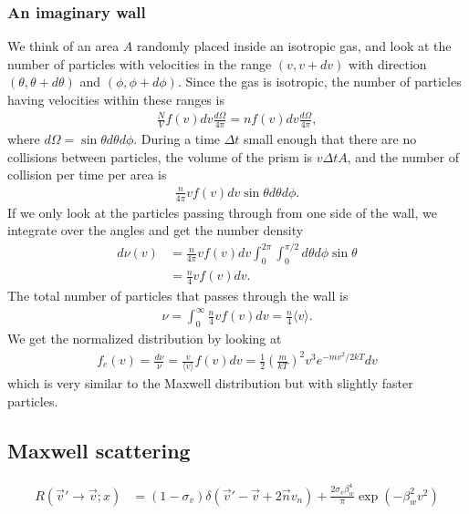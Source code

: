 \subsubsection{An imaginary wall}
We think of an area $A$ randomly placed inside an isotropic gas, and look at the number of particles with velocities in the range $(v, v+dv)$ with direction $(\theta, \theta + d\theta)$ and $(\phi, \phi + d\phi)$. Since the gas is isotropic, the number of particles having velocities within these ranges is 
\begin{align*}
	\frac{N}{V}f(v)dv \frac{d\Omega}{4\pi} = nf(v)dv \frac{d\Omega}{4\pi},
\end{align*}
where $d\Omega=\sin\theta d\theta d\phi$. During a time $\Delta t$ small enough that there are no collisions between particles, the volume of the prism is $v\Delta t A$, and the number of collision per time per area is 
\begin{align*}
	\frac{n}{4\pi} v f(v)dv \sin\theta d\theta d\phi.
\end{align*}
If we only look at the particles passing through from one side of the wall, we integrate over the angles and get the number density
\begin{align*}
	d\nu(v) &= \frac{n}{4\pi} v f(v)dv \int_0^{2\pi}\int_0^{\pi/2}d\theta d\phi \sin\theta\\
	&= \frac{n}{4} v f(v) dv.
\end{align*}
The total number of particles that passes through the wall is
\begin{align*}
	\nu = \int_0^\infty \frac{n}{4} v f(v) dv = \frac{n}{4} \langle v \rangle.
\end{align*}
We get the normalized distribution by looking at 
\begin{align*}
	f_e(v) = \frac{d\nu}{\nu} = \frac{v}{\langle v \rangle} f(v) dv = \frac{1}{2} \left(\frac{m}{kT}\right)^2 v^3 e^{-mv^2/2kT}dv
\end{align*}
which is very similar to the Maxwell distribution but with slightly faster particles. 

\subsection{Maxwell scattering}
\begin{align}
	R(\vec v'\rightarrow \vec v; x) &= (1-\sigma_v)\delta(\vec v' - \vec v + 2\vec nv_n) + \frac{2\sigma_v\beta_w^4}{\pi}\exp(-\beta_w^2v^2)
\end{align}

